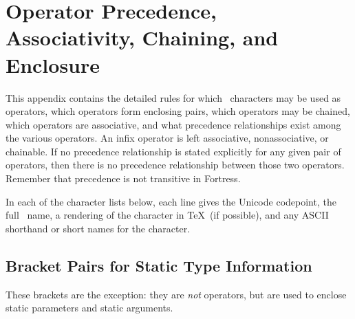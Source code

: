 %
%
%
%

\chapter{Operator Precedence, Associativity, Chaining, and Enclosure}

\newcommand{\UnicodeOp}[4]{~~\texttt{#1}\>\texttt{\footnotesize #2}\>{#3}\>{#4}}
\newcommand{\UnicodeKillLine}{~~\texttt{U+0000}~~\={\footnotesize\texttt{LESS-THAN ABOVE SLANTED EQUAL ABOVE GREATER-THAN ABOVE SLANTED EQUAL}}~~\=\quad\quad\=\kill}


This appendix contains the detailed rules
for which \unicode\ characters may be used as operators,
which operators form enclosing pairs,
which operators may be chained,
which operators are associative,
and what precedence relationships exist among the various operators.
An infix operator is left associative, nonassociative, or chainable.
If no precedence relationship is stated explicitly
for any given pair of operators,
then there is no precedence relationship between those two operators.
Remember that precedence is not transitive in Fortress.

In each of the character lists below,
each line gives the Unicode codepoint,
the full \unicode\ name,
a rendering of the character in \TeX\ (if possible),
and any ASCII shorthand or short names for the character.



\section{Bracket Pairs for Static Type Information}

These brackets are the exception: they are \emph{not} operators, but are used to enclose static parameters
and static arguments.


